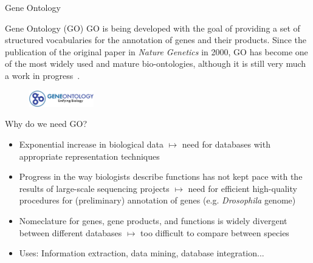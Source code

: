 \documentclass{beamer}
\begin{document}
\begin{frame}{Gene Ontology}
    \begin{mybluebox}{Gene Ontology (GO)}
    GO is being developed with the goal of providing a
    set of structured vocabularies for the annotation of genes and their products. Since    	the publication  of the original paper in \emph{Nature Genetics} in 2000, GO
    has become one of the most widely used and mature bio-ontologies,
    although it is still very much a work in progress~\cite{GO2019}.
    \end{mybluebox}
    
    \begin{figure}
     \centering
     \includegraphics[width=0.25\textwidth]{./img/GOlogo.png}
    \end{figure}
    
\end{frame}


\begin{frame}{Why do we need GO?}
\begin{itemize}
\item Exponential increase in biological data $\longmapsto$ need for databases with appropriate 
representation techniques
\item Progress in the way biologists describe functions has not kept pace with the results of 
large-scale sequencing projects $\longmapsto$ need for eff{}icient high-quality procedures for 
(preliminary) annotation of genes (e.g. \textit{Drosophila} genome)
\item Nomeclature for genes, gene products, and functions is widely divergent between dif{}ferent 
databases $\longmapsto$ too diff{}icult to compare between species

\item Uses: Information extraction, data mining, database integration...

\end{itemize}
\end{frame}

\end{document}
